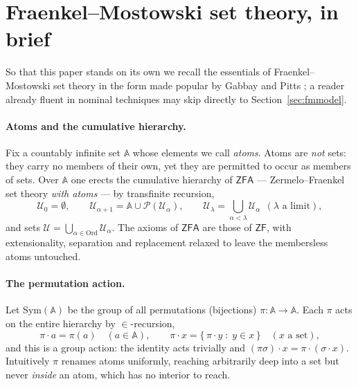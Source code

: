 \providecommand{\Atoms}{\mathbb{A}}        %
\providecommand{\Sym}{\mathrm{Sym}}        %
\providecommand{\pow}{\mathcal{P}}         %
\providecommand{\Ord}{\mathrm{Ord}}        %
\providecommand{\supp}{\mathrm{supp}}      %
\providecommand{\fs}{\mathrm{fs}}          %
\providecommand{\new}{\mathbin{\reflectbox{\ensuremath{\mathsf{N}}}}} %

\section{Fraenkel--Mostowski set theory, in brief}
\label{sec:fm}

So that this paper stands on its own we recall the essentials of
Fraenkel--Mostowski set theory in the form made popular by Gabbay and Pitts
\cite{DBLP:journals/fac/GabbayP02}; a reader already fluent in nominal
techniques may skip directly to Section~\ref{sec:fmmodel}.

\paragraph{Atoms and the cumulative hierarchy.}
Fix a countably infinite set $\Atoms$ whose elements we call \emph{atoms}.
Atoms are \emph{not} sets: they carry no members of their own, yet they are
permitted to occur as members of sets. Over $\Atoms$ one erects the cumulative
hierarchy of $\mathsf{ZFA}$ --- Zermelo--Fraenkel set theory \emph{with atoms}
--- by transfinite recursion,
\[
  \mathcal{U}_0 = \emptyset,\qquad
  \mathcal{U}_{\alpha+1} = \Atoms \cup \pow(\mathcal{U}_\alpha),\qquad
  \mathcal{U}_\lambda = \bigcup_{\alpha<\lambda}\mathcal{U}_\alpha\ \ (\lambda\text{ a limit}),
\]
and sets $\mathcal{U} = \bigcup_{\alpha\in\Ord}\mathcal{U}_\alpha$. The axioms of
$\mathsf{ZFA}$ are those of $\mathsf{ZF}$, with extensionality, separation and
replacement relaxed to leave the membersless atoms untouched.

\paragraph{The permutation action.}
Let $\Sym(\Atoms)$ be the group of all permutations (bijections)
$\pi\colon\Atoms\to\Atoms$. Each $\pi$ acts on the entire hierarchy by
$\in$-recursion,
\[
  \pi\cdot a = \pi(a)\quad(a\in\Atoms),
  \qquad
  \pi\cdot x = \{\,\pi\cdot y \;:\; y\in x\,\}\quad(x\text{ a set}),
\]
and this is a group action: the identity acts trivially and
$(\pi\sigma)\cdot x = \pi\cdot(\sigma\cdot x)$. Intuitively $\pi$ renames atoms
uniformly, reaching arbitrarily deep into a set but never \emph{inside} an atom,
which has no interior to reach.

